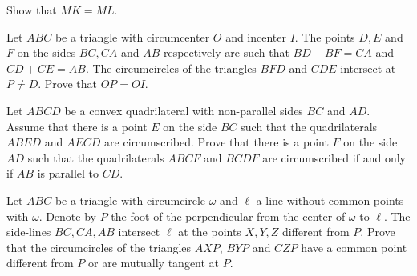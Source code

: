 Show that 
$MK=ML$.

\item[\textbf{G6.}]
Let 
$ABC$
 be a triangle with circumcenter 
$O$
 and incenter 
$I$.
 The points 
$D,E$
 and 
$F$
 on the sides 
$BC,CA$
 and 
$AB$
 respectively are such that 
$BD+BF=CA$
 and 
$CD+CE=AB$.
 The circumcircles of the triangles 
$BFD$
 and 
$CDE$
 intersect at 
$P \neq D$.
 Prove that 
$OP=OI$.

\item[\textbf{G7.}]
Let 
$ABCD$
 be a convex quadrilateral with non-parallel sides 
$BC$
 and 
$AD$.
 Assume that there is a point 
$E$
 on the side 
$BC$
 such that the quadrilaterals 
$ABED$
 and 
$AECD$
 are circumscribed. Prove that there is a point 
$F$
 on the side 
$AD$
 such that the quadrilaterals 
$ABCF$
 and 
$BCDF$
 are circumscribed if and only if 
$AB$
 is parallel to 
$CD$.

\item[\textbf{G8.}]
Let 
$ABC$
 be a triangle with circumcircle 
$\omega$
 and 
$\ell$
 a line without common points with 
$\omega$.
 Denote by 
$P$
 the foot of the perpendicular from the center of 
$\omega$
 to 
$\ell$.
 The side-lines 
$BC,CA,AB$
 intersect 
$\ell$
 at the points 
$X,Y,Z$
 different from 
$P$.
 Prove that the circumcircles of the triangles 
$AXP$, 
$BYP$
 and 
$CZP$
 have a common point different from 
$P$
 or are mutually tangent at 
$P$.

